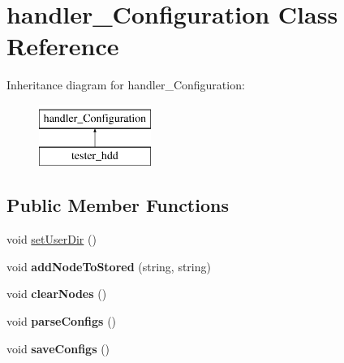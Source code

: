 \hypertarget{classhandler__Configuration}{
\section{handler\_\-Configuration Class Reference}
\label{classhandler__Configuration}
}
Inheritance diagram for handler\_\-Configuration:\begin{figure}[H]
\begin{center}
\leavevmode
\includegraphics[height=2cm]{classhandler__Configuration}
\end{center}
\end{figure}
\subsection*{Public Member Functions}
\begin{DoxyCompactItemize}
\item 
void \hyperlink{classhandler__Configuration_a9f850565461949dbb96f6cc5028618c1}{setUserDir} ()
\item 
\hypertarget{classhandler__Configuration_a0dcef9ff84f43679905f5e5c81f5653f}{
void {\bfseries addNodeToStored} (string, string)}
\label{classhandler__Configuration_a0dcef9ff84f43679905f5e5c81f5653f}

\item 
\hypertarget{classhandler__Configuration_abcaa51f67c80dce0b76a9fee5c19b59a}{
void {\bfseries clearNodes} ()}
\label{classhandler__Configuration_abcaa51f67c80dce0b76a9fee5c19b59a}

\item 
\hypertarget{classhandler__Configuration_a3dc84c5be06ae0caa5c53954842e407f}{
void {\bfseries parseConfigs} ()}
\label{classhandler__Configuration_a3dc84c5be06ae0caa5c53954842e407f}

\item 
\hypertarget{classhandler__Configuration_ab7b078c0151a3c1efba8d2079cefcce8}{
void {\bfseries saveConfigs} ()}
\label{classhandler__Configuration_ab7b078c0151a3c1efba8d2079cefcce8}

\end{DoxyCompactItemize}
